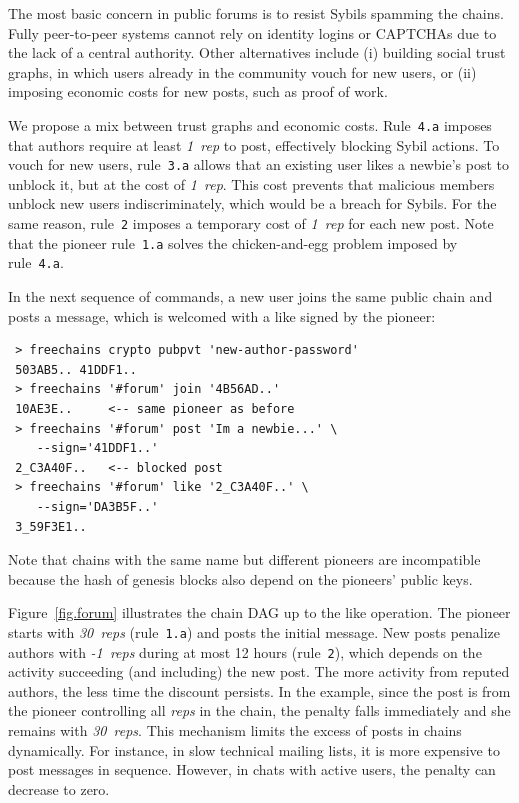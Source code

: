 \documentclass[10pt,journal,compsoc]{IEEEtran}
\newcommand{\reps}     {\emph{reps}\xspace}
\newcommand{\onerep}   {\emph{1~rep}\xspace}
\newcommand{\nreps}[1] {\emph{#1~reps\xspace}}
\begin{document}
The most basic concern in public forums is to resist Sybils spamming the
chains.
Fully peer-to-peer systems cannot rely on identity logins or CAPTCHAs due
to the lack of a central authority.
Other alternatives include (i) building social trust graphs, in which users
already in the community vouch for new users, or (ii) imposing economic costs
for new posts, such as proof of work.

We propose a mix between trust graphs and economic costs.
%
Rule~\texttt{4.a} imposes that authors require at least \onerep to post,
effectively blocking Sybil actions.
To vouch for new users, rule~\texttt{3.a} allows that an existing user likes a
newbie's post to unblock it, but at the cost of \onerep.
This cost prevents that malicious members unblock new users indiscriminately,
which would be a breach for Sybils.
For the same reason, rule~\texttt{2} imposes a temporary cost of \onerep for
each new post.
%
Note that the pioneer rule~\texttt{1.a} solves the chicken-and-egg problem
imposed by rule~\texttt{4.a}.

In the next sequence of commands, a new user joins the same public chain and
posts a message, which is welcomed with a like signed by the pioneer:

{\footnotesize
\begin{verbatim}
 > freechains crypto pubpvt 'new-author-password'
 503AB5.. 41DDF1..
 > freechains '#forum' join '4B56AD..'
 10AE3E..     <-- same pioneer as before
 > freechains '#forum' post 'Im a newbie...' \
    --sign='41DDF1..'
 2_C3A40F..   <-- blocked post
 > freechains '#forum' like '2_C3A40F..' \
    --sign='DA3B5F..'
 3_59F3E1..
\end{verbatim}
}

Note that chains with the same name but different pioneers are incompatible
because the hash of genesis blocks also depend on the pioneers' public keys.

Figure~\ref{fig.forum} illustrates the chain DAG up to the like operation.
The pioneer starts with \nreps{30} (rule~\texttt{1.a}) and posts the initial
message.
%
New posts penalize authors with \nreps{-1} during at most 12 hours
(rule~\texttt{2}), which depends on the activity succeeding (and including) the
new post.
The more activity from reputed authors, the less time the discount persists.
In the example, since the post is from the pioneer controlling all \reps in the
chain, the penalty falls immediately and she remains with \nreps{30}.
This mechanism limits the excess of posts in chains dynamically.
For instance, in slow technical mailing lists, it is more expensive to post
messages in sequence.
However, in chats with active users, the penalty can decrease to zero.
\end{document}
